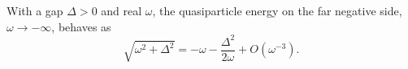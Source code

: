 \documentclass{article}
\begin{document}
With a gap $\Delta>0$ and real $\omega$, the quasiparticle energy on the far negative side, $\omega\to-\infty$, behaves as
\begin{equation}
\sqrt{\omega^2+\Delta^2} = -\omega - \frac{\Delta^2}{2\omega} + O(\omega^{-3}) .
\label{eq:tail}
\end{equation}
\end{document}
